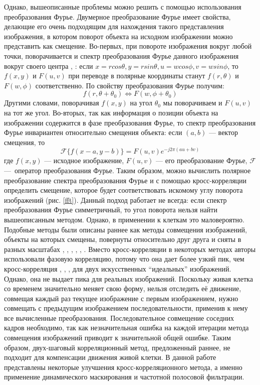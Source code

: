 \documentclass[oneside,final,14pt]{extreport}
\begin{document}
Однако, вышеописанные проблемы можно решить с помощью использования преобразования Фурье. Двумерное преобразование Фурье имеет свойства, делающие его очень подходящим для нахождения такого представления изображения, в котором поворот объекта на исходном изображении можно представить как смещение. Во-первых, при повороте изображения вокруг любой точки, поворачивается и спектр преобразования Фурье данного изображения вокруг своего центра \cite{sheng1986experiments}, \cite{bracewell1986fourier}: если \(x = r cos \theta, y = r sin \theta, u = w cos\phi,  v = w sin\phi\), то \(f(x,y)\) и  \(F(u,v)\) при переводе в полярные координаты станут \(f(r,\theta)\) и \(F(w,\phi)\) соответственно. По свойству преобразования Фурье получим:
\begin{equation}  f(r, \theta + \theta_0) \Leftrightarrow F(w, \phi + \theta_0)\end{equation}
Другими словами, поворачивая \(f(x,y)\) на угол \(\theta_0\)   мы поворачиваем и \(F(u,v)\) на тот же угол.
Во-вторых, так как информация о позиции объекта на изображении содержится в фазе преобразования Фурье, то спектр преобразования Фурье инвариантен относительно смещения объекта: если \((a,b)\) --- вектор смещения, то
\begin{equation} \mathcal F\{f(x - a, y - b)\} = F(u, v) e^{-j2\pi(au + bv)} \end{equation}
где \(f(x,y)\) --- исходное изображение, \(F(u,v)\) --- его преобразование Фурье, \(\mathcal{F}\)  ---~оператор преобразования Фурье.
 Таким образом, можно вычислить полярное преобразование спектра преобразования Фурье и с помощью кросс-корреляции определить смещение, которое будет соответствовать искомому углу поворота изображений (рис. \ref{fft}).  Данный подход работает не всегда: если спектр преобразования Фурье симметричный, то угол поворота нельзя найти вышеописанным методом. Однако, в применении к клеткам это маловероятно.
 Подобные методы были описаны раннее как методы совмещения изображений, объекты на которых смещены, повернуты относительно друг друга и сняты в разных масштабах \cite{reddy1996fft}, \cite{sheng1986experiments}, \cite{chen1994symmetric}, \cite{erturk2003translation}, \cite{de1987registration}, \cite{horner1984phase}. Вместо кросс-корреляции в некоторых методах  авторы использовали фазовую корреляцию, потому что она дает более узкий пик, чем кросс-корреляция \cite{sheng1986experiments}, \cite{erturk2003translation}, \cite{de1987registration}, \cite{lee1993principles} для двух искусственных ``идеальных'' изображений. Однако, она не выдает пика для реальных изображений. Поскольку живая клетка со временем значительно меняет свою форму, нельзя отследить её движение, совмещая каждый раз текущее изображение с первым изображением, нужно совмещать  с предыдущим изображением последовательности, применив к нему все вычисленные преобразования. Последовательное совмещение соседних кадров необходимо, так как незначительная ошибка на каждой итерации метода совмещения изображений приводит к значительной общей ошибке. Таким образом, двух-шаговый корреляционный метод, предложенный раннее, не подходит для компенсации движения живой клетки. В данной работе представлены некоторые улучшения кросс-корреляционного метода, а именно применение динамического маскирования и частотной полосовой фильтрации.
\end{document}
